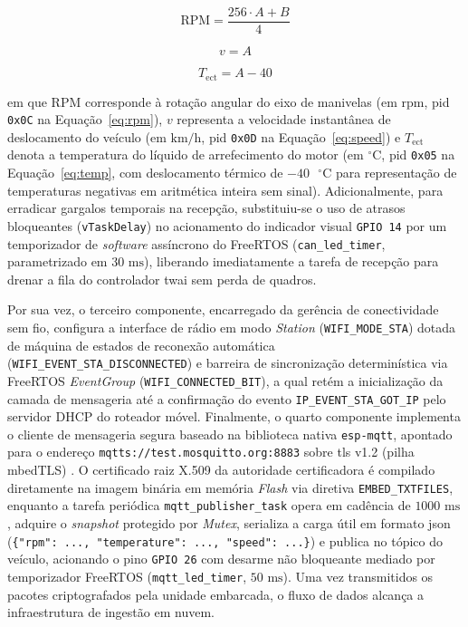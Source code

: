\documentclass[
	12pt,				%
	openright,			%
	twoside,			%
	a4paper,			%
	english,			%
	brazil				%
	]{abntex2}
\newcounter{quadro}
\begin{document}
\begin{equation}\label{eq:rpm}
\text{RPM} = \frac{256 \cdot A + B}{4}
\end{equation}

\begin{equation}\label{eq:speed}
v = A
\end{equation}

\begin{equation}\label{eq:temp}
T_{\text{ect}} = A - 40
\end{equation}

\noindent em que $\text{RPM}$ corresponde à rotação angular do eixo de manivelas (em
$\text{rpm}$, \acrshort{pid} \texttt{0x0C} na Equação~\eqref{eq:rpm}), $v$ representa a
velocidade instantânea de deslocamento do veículo (em $\text{km/h}$, \acrshort{pid}
\texttt{0x0D} na Equação~\eqref{eq:speed}) e $T_{\text{ect}}$ denota a temperatura do
líquido de arrefecimento do motor (em $^{\circ}\text{C}$, \acrshort{pid} \texttt{0x05}
na Equação~\eqref{eq:temp}, com deslocamento térmico de $-40\text{ }^{\circ}\text{C}$
para representação de temperaturas negativas em aritmética inteira sem sinal).
Adicionalmente, para erradicar gargalos temporais na recepção, substituiu-se o uso de
atrasos bloqueantes (\texttt{vTaskDelay}) no acionamento do indicador visual
\texttt{GPIO 14} por um temporizador de \textit{software} assíncrono do FreeRTOS
(\texttt{can\_led\_timer}, parametrizado em $30\text{ ms}$), liberando imediatamente a
tarefa de recepção para drenar a fila do controlador \acrshort{twai} sem perda de
quadros.

Por sua vez, o terceiro componente, encarregado da gerência de conectividade sem fio,
configura a interface de rádio em modo \textit{Station} (\texttt{WIFI\_MODE\_STA})
dotada de máquina de estados de reconexão automática
(\texttt{WIFI\_\allowbreak EVENT\_\allowbreak STA\_\allowbreak DISCONNECTED}) e barreira
de sincronização determinística via FreeRTOS \textit{EventGroup}
(\texttt{WIFI\_\allowbreak CONNECTED\_\allowbreak BIT}), a qual retém a inicialização da
camada de mensageria até a confirmação do evento
\texttt{IP\_\allowbreak EVENT\_\allowbreak STA\_\allowbreak GOT\_IP} pelo servidor DHCP
do roteador móvel. Finalmente, o quarto componente implementa o cliente de mensageria
segura baseado na biblioteca nativa \texttt{esp-mqtt}, apontado para o endereço
\texttt{mqtts://test.mosquitto.org:8883} sobre \acrshort{tls} v1.2 (pilha mbedTLS)
\cite{dierks2008}. O certificado raiz X.509 da autoridade certificadora é compilado
diretamente na imagem binária em memória \textit{Flash} via diretiva
\texttt{EMBED\_\allowbreak TXTFILES}, enquanto a tarefa periódica
\texttt{mqtt\_\allowbreak publisher\_\allowbreak task} opera em cadência de
$1000\text{ ms}$, adquire o \textit{snapshot} protegido por \textit{Mutex}, serializa a
carga útil em formato \acrshort{json}
(\texttt{\{"rpm": ..., "temperature": ..., "speed": ...\}}) e publica no tópico do
veículo, acionando o pino \texttt{GPIO 26} com desarme não bloqueante mediado por
temporizador FreeRTOS (\texttt{mqtt\_\allowbreak led\_timer}, $50\text{ ms}$). Uma vez
transmitidos os pacotes criptografados pela unidade embarcada, o fluxo de dados alcança
a infraestrutura de ingestão em nuvem.
\end{document}
